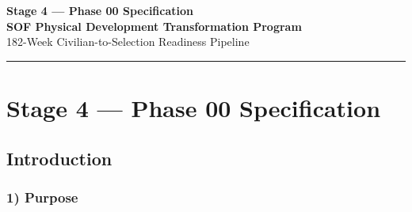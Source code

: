 \documentclass[10pt]{article}
\newcommand{\TitleLine}{\textcolor{StageBlue}{\rule{0.98\linewidth}{0.95pt}}}
\begin{document}
\begin{tcolorbox}
\begin{center}
{\LARGE\bfseries Stage 4 — Phase 00 Specification}\\[0.35em]
{\Large\bfseries SOF Physical Development Transformation Program}\\[0.25em]
{\large 182-Week Civilian-to-Selection Readiness Pipeline}\\[0.65em]
\TitleLine
\end{center}
\end{tcolorbox}

\vspace{0.35em}

\section*{Stage 4 — Phase 00 Specification}
{}

\subsection*{Introduction}
{}

\subsubsection*{1) Purpose}
\end{document}

